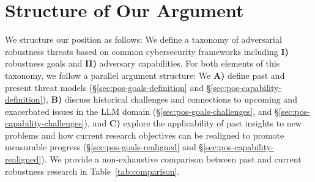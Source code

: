 

\section{Structure of Our Argument}\label{sec:structure}

We structure our position as follows: We define a taxonomy of adversarial robustness threats based on common cybersecurity frameworks including \textbf{I)} robustness goals and \textbf{II)} adversary capabilities. For both elements of this taxonomy, we follow a parallel argument structure: We \textbf{A)} define past and present threat models (\S\ref{sec:pos-goals-definition} and \S\ref{sec:pos-capability-definition}), \textbf{B)} discuss historical challenges and connections to upcoming and exacerbated issues in the LLM domain (\S\ref{sec:pos-goals-challenges}, and \S\ref{sec:pos-capability-challenges}), and \textbf{C)} explore the applicability of past insights to new problems and how current research objectives can be realigned to promote measurable progress (\S\ref{sec:pos-goals-realigned} and \S\ref{sec:pos-capability-realigned}). We provide a non-exhaustive comparison between past and current robustness research in Table~\ref{tab:comparison}.%

